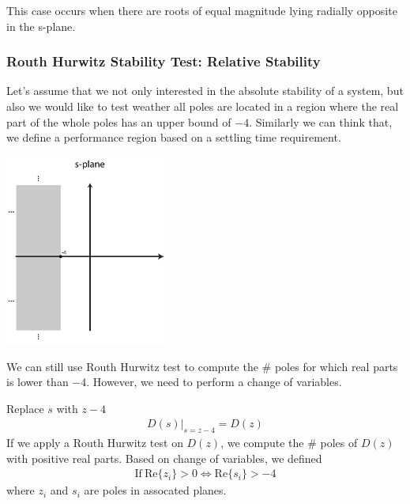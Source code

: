 \documentclass[twoside]{article}
\begin{document}
This case occurs when there are roots of equal magnitude lying
radially opposite in the s-plane. 

\newpage

\subsubsection{Routh Hurwitz Stability Test: Relative Stability}

Let's assume that we not only interested in the absolute stability of
a system, but also we would like to test weather all poles are located 
in a region where the real part of the whole poles has an upper bound
of $-4$. Similarly we can think that, we define a performance region
based on a settling time requirement. 

  \begin{minipage}[h]{1\linewidth}
    \begin{center}
      \includegraphics[width=0.4\textwidth]{settling}
    \end{center}
  \end{minipage}

We can still use Routh Hurwitz test to compute the 
$\#$ poles for which real parts is lower than $-4$.
However, we need to perform a change of variables.

Replace $s$ with $z - 4$
%
\begin{align*}
  D(s)|_{s = z- 4} = D(z)
\end{align*}
%
If we apply a Routh Hurwitz test on $D(z)$, we compute the $\#$
poles of $D(z)$ with positive real parts. Based on change of
variables, we defined 
%
\begin{align*}
\mathrm{If} \ \mathrm{Re} \lbrace z_i \rbrace > 0 \Leftrightarrow
\mathrm{Re} \lbrace s_i \rbrace > -4
\end{align*}
%
where $z_i$ and $s_i$ are poles in assocated planes. 

\vspace{12pt}
\end{document}
